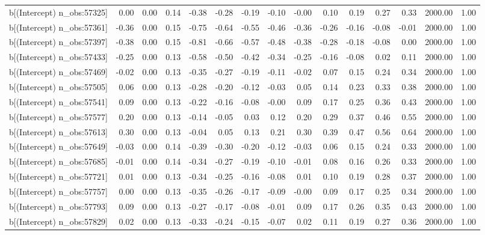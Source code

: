 \begin{table}[ht]
\begin{tabular}{rrrrrrrrrrrrrrr}
  b[(Intercept) n\_obs:57325] & 0.00 & 0.00 & 0.14 & -0.38 & -0.28 & -0.19 & -0.10 & -0.00 & 0.10 & 0.19 & 0.27 & 0.33 & 2000.00 & 1.00 \\ 
  b[(Intercept) n\_obs:57361] & -0.36 & 0.00 & 0.15 & -0.75 & -0.64 & -0.55 & -0.46 & -0.36 & -0.26 & -0.16 & -0.08 & -0.01 & 2000.00 & 1.00 \\ 
  b[(Intercept) n\_obs:57397] & -0.38 & 0.00 & 0.15 & -0.81 & -0.66 & -0.57 & -0.48 & -0.38 & -0.28 & -0.18 & -0.08 & 0.00 & 2000.00 & 1.00 \\ 
  b[(Intercept) n\_obs:57433] & -0.25 & 0.00 & 0.13 & -0.58 & -0.50 & -0.42 & -0.34 & -0.25 & -0.16 & -0.08 & 0.02 & 0.11 & 2000.00 & 1.00 \\ 
  b[(Intercept) n\_obs:57469] & -0.02 & 0.00 & 0.13 & -0.35 & -0.27 & -0.19 & -0.11 & -0.02 & 0.07 & 0.15 & 0.24 & 0.34 & 2000.00 & 1.00 \\ 
  b[(Intercept) n\_obs:57505] & 0.06 & 0.00 & 0.13 & -0.28 & -0.20 & -0.12 & -0.03 & 0.05 & 0.14 & 0.23 & 0.33 & 0.38 & 2000.00 & 1.00 \\ 
  b[(Intercept) n\_obs:57541] & 0.09 & 0.00 & 0.13 & -0.22 & -0.16 & -0.08 & -0.00 & 0.09 & 0.17 & 0.25 & 0.36 & 0.43 & 2000.00 & 1.00 \\ 
  b[(Intercept) n\_obs:57577] & 0.20 & 0.00 & 0.13 & -0.14 & -0.05 & 0.03 & 0.12 & 0.20 & 0.29 & 0.37 & 0.46 & 0.55 & 2000.00 & 1.00 \\ 
  b[(Intercept) n\_obs:57613] & 0.30 & 0.00 & 0.13 & -0.04 & 0.05 & 0.13 & 0.21 & 0.30 & 0.39 & 0.47 & 0.56 & 0.64 & 2000.00 & 1.00 \\ 
  b[(Intercept) n\_obs:57649] & -0.03 & 0.00 & 0.14 & -0.39 & -0.30 & -0.20 & -0.12 & -0.03 & 0.06 & 0.15 & 0.24 & 0.33 & 2000.00 & 1.00 \\ 
  b[(Intercept) n\_obs:57685] & -0.01 & 0.00 & 0.14 & -0.34 & -0.27 & -0.19 & -0.10 & -0.01 & 0.08 & 0.16 & 0.26 & 0.33 & 2000.00 & 1.00 \\ 
  b[(Intercept) n\_obs:57721] & 0.01 & 0.00 & 0.13 & -0.34 & -0.25 & -0.16 & -0.08 & 0.01 & 0.10 & 0.19 & 0.28 & 0.37 & 2000.00 & 1.00 \\ 
  b[(Intercept) n\_obs:57757] & 0.00 & 0.00 & 0.13 & -0.35 & -0.26 & -0.17 & -0.09 & -0.00 & 0.09 & 0.17 & 0.25 & 0.34 & 2000.00 & 1.00 \\ 
  b[(Intercept) n\_obs:57793] & 0.09 & 0.00 & 0.13 & -0.27 & -0.17 & -0.08 & -0.01 & 0.09 & 0.17 & 0.26 & 0.35 & 0.43 & 2000.00 & 1.00 \\ 
  b[(Intercept) n\_obs:57829] & 0.02 & 0.00 & 0.13 & -0.33 & -0.24 & -0.15 & -0.07 & 0.02 & 0.11 & 0.19 & 0.27 & 0.36 & 2000.00 & 1.00 \\ 

\end{tabular}
\end{table}
